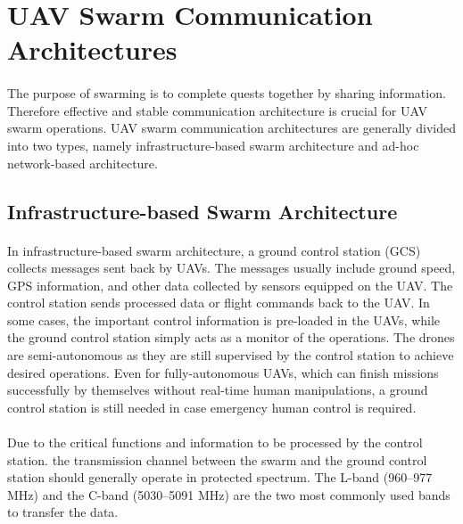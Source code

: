 \documentclass[a4paper,12pt]{report}
\begin{document}
\section{UAV Swarm Communication Architectures}

\paragraph{}
The purpose of swarming is to complete quests together by sharing information. Therefore effective and stable communication architecture is crucial for UAV swarm operations. UAV swarm communication architectures are generally divided into two types, namely infrastructure-based swarm architecture and ad-hoc network-based architecture\cite{doi:10.1139/juvs-2018-0009, bekmezci2013flying, chen2020toward}.

\subsection{Infrastructure-based Swarm Architecture}
\paragraph{}
In infrastructure-based swarm architecture, a ground control station (GCS) collects messages sent back by UAVs. The messages usually include ground speed, GPS information, and other data collected by sensors equipped on the UAV\cite{doi:10.1139/juvs-2018-0009}. The control station sends processed data or flight commands back to the UAV. In some cases, the important control information is pre-loaded in the UAVs, while the ground control station simply acts as a monitor of the operations. The drones are semi-autonomous as they are still supervised by the control station to achieve desired operations\cite{doi:10.1139/juvs-2018-0009, bekmezci2013flying}. Even for fully-autonomous UAVs, which can finish missions successfully by themselves without real-time human manipulations, a ground control station is still needed in case emergency human control is required\cite{7470933}.

\paragraph{}
Due to the critical functions and information to be processed by the control station. the transmission channel between the swarm and the ground control station should generally operate in protected spectrum. The L-band (960–977 MHz) and the C-band (5030–5091 MHz) are the two most commonly used bands to transfer the data\cite{7470933, bands1, 6712625}. 
\end{document}
